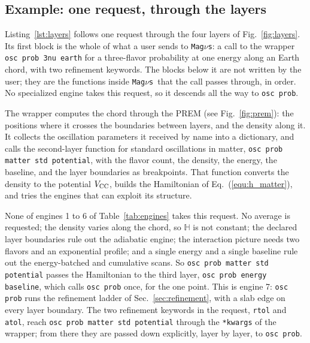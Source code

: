 \documentclass[final,5p,times,twocolumn,sort,compress]{elsarticle}
\makeatletter
\newcommand{\eq}{Eq.}
\newcommand{\fig}{Fig.}
\DeclareRobustCommand{\_}{%
  \ifmmode\nfss@text{\textunderscore}\else\textunderscore\allowbreak\fi}
\newcommand{\Tab}{Table}
\newcommand{\equ}[1]{\eq~(\ref{equ:#1})}
\newcommand{\figu}[1]{\fig~\ref{fig:#1}}
\newcommand{\tabl}[1]{\Tab~\ref{tab:#1}}
\newcommand{\magnus}{{\tt Mag}\ensuremath{\nu}{\tt s}}
\makeatother
\begin{document}

\subsection{Example: one request, through the layers}
\label{sec:one_request}

Listing~\ref{lst:layers} follows one request through the four layers of \figu{layers}. Its first block is the whole of what a user sends to \magnus: a call to the wrapper {\tt osc\_prob\_3nu\_earth} for a three-flavor probability at one energy along an Earth chord, with two refinement keywords. The blocks below it are not written by the user; they are the functions inside \magnus\ that the call passes through, in order. No specialized engine takes this request, so it descends all the way to {\tt osc\_prob}.

The wrapper computes the chord through the PREM (see \figu{prem}): the positions where it crosses the boundaries between layers, and the density along it. It collects the oscillation parameters it received by name into a dictionary, and calls the second-layer function for standard oscillations in matter, {\tt osc\_prob\_matter\_std\_potential}, with the flavor count, the density, the energy, the baseline, and the layer boundaries as breakpoints. That function converts the density to the potential $V_{\rm CC}$, builds the Hamiltonian of \equ{h_matter}, and tries the engines that can exploit its structure.

None of engines 1 to 6 of \tabl{engines} takes this request. No average is requested; the density varies along the chord, so $\mathbb{H}$ is not constant; the declared layer boundaries rule out the adiabatic engine; the interaction picture needs two flavors and an exponential profile; and a single energy and a single baseline rule out the energy-batched and cumulative scans. So {\tt osc\_prob\_matter\_std\_potential} passes the Hamiltonian to the third layer, {\tt osc\_prob\_energy\_baseline}, which calls {\tt osc\_prob} once, for the one point. This is engine 7: {\tt osc\_prob} runs the refinement ladder of Sec.~\ref{sec:refinement}, with a slab edge on every layer boundary. The two refinement keywords in the request, {\tt rtol} and {\tt atol}, reach {\tt osc\_prob\_matter\_std\_potential} through the {\tt **kwargs} of the wrapper; from there they are passed down explicitly, layer by layer, to {\tt osc\_prob}.
\end{document}

